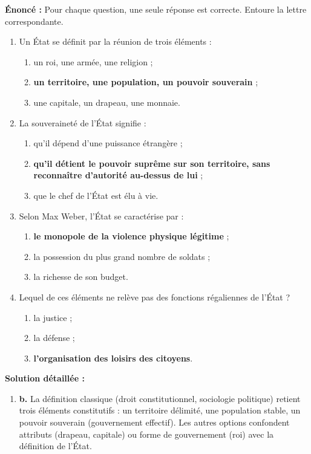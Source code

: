 \documentclass[11pt]{article}
\newcommand{\cle}[1]{{\popxbold\color{popdark}#1}}
\begin{document}
\begin{exoresolu}
\textbf{Énoncé :} Pour chaque question, une seule réponse est correcte. Entoure la lettre correspondante.
\begin{enumerate}
\item Un État se définit par la réunion de trois éléments :
\begin{enumerate}
\item un roi, une armée, une religion ;
\item \textbf{un territoire, une population, un pouvoir souverain} ;
\item une capitale, un drapeau, une monnaie.
\end{enumerate}
\item La souveraineté de l'État signifie :
\begin{enumerate}
\item qu'il dépend d'une puissance étrangère ;
\item \textbf{qu'il détient le pouvoir suprême sur son territoire, sans reconnaître d'autorité au-dessus de lui} ;
\item que le chef de l'État est élu à vie.
\end{enumerate}
\item Selon Max Weber, l'État se caractérise par :
\begin{enumerate}
\item \textbf{le monopole de la violence physique légitime} ;
\item la possession du plus grand nombre de soldats ;
\item la richesse de son budget.
\end{enumerate}
\item Lequel de ces éléments ne relève pas des fonctions régaliennes de l'État ?
\begin{enumerate}
\item la justice ; \item la défense ; \item \textbf{l'organisation des loisirs des citoyens}.
\end{enumerate}
\end{enumerate}
\tcblower
\textbf{Solution détaillée :}
\begin{enumerate}
\item \textbf{b.} La définition classique (droit constitutionnel, sociologie politique) retient trois éléments constitutifs : un \cle{territoire} délimité, une \cle{population} stable, un \cle{pouvoir souverain} (gouvernement effectif). Les autres options confondent attributs (drapeau, capitale) ou forme de gouvernement (roi) avec la définition de l'État.

\end{enumerate}
\end{exoresolu}
\end{document}
